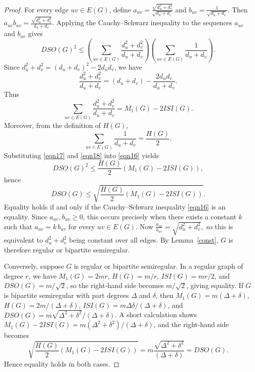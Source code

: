 \documentclass{article}
\theoremstyle{definition}
\begin{document}
\begin{proof}
For every edge $uv\in E(G)$, define
$
a_{uv}=\frac{\sqrt{d_u^2+d_v^2}}{\sqrt{d_u+d_v}}$ and $b_{uv}=\frac{1}{\sqrt{d_u+d_v}}$.
Then $a_{uv} b_{uv}=\frac{\sqrt{d_u^2+d_v^2}}{d_u+d_v}$.
Applying the Cauchy–Schwarz inequality to the sequences $a_{uv}$ and $b_{uv}$ gives
\begin{equation}\label{eqn16}
DSO(G)^2
\le 
\left(\sum_{uv\in E(G)} \frac{d_u^2+d_v^2}{d_u+d_v}\right)
\left(\sum_{uv\in E(G)} \frac{1}{d_u+d_v}\right). 
\end{equation}
Since $d_u^2+d_v^2=(d_u+d_v)^2-2d_u d_v$, we have
\[
\frac{d_u^2+d_v^2}{d_u+d_v}
=
(d_u+d_v)-\frac{2d_u d_v}{d_u+d_v}.
\]
Thus
\begin{equation}\label{eqn17}
\sum_{uv\in E(G)} \frac{d_u^2+d_v^2}{d_u+d_v}
=
M_1(G)-2ISI(G).
\end{equation}
Moreover, from the definition of $H(G)$,
\begin{equation}\label{eqn18}
\sum_{uv\in E(G)} \frac{1}{d_u+d_v}
=
\frac{H(G)}{2}. 
\end{equation}
Substituting \eqref{eqn17} and \eqref{eqn18} into \eqref{eqn16} yields
\[
DSO(G)^2
\le 
\frac{H(G)}{2} \left(M_1(G)-2ISI(G)\right),
\]
hence
\[
DSO(G)
\le 
\sqrt{\frac{H(G)}{2} \left(M_1(G)-2ISI(G)\right)}.
\]
Equality holds if and only if the Cauchy–Schwarz inequality \eqref{eqn16} is an equality. Since $a_{uv}, b_{uv}\ge 0$, this occurs precisely when there exists a constant $k$ such that $a_{uv}=k\,b_{uv}$ for every $uv\in E(G)$.
Now
$
\frac{a_{uv}}{b_{uv}} = \sqrt{d_u^2+d_v^2},
$
so this is equivalent to
$d_u^2+d_v^2$
being constant over all edges.
 By Lemma~\ref{const}, $G$ is therefore regular or bipartite semiregular.

Conversely, suppose $G$ is regular or bipartite semiregular.
In a regular graph of degree $r$, we have
$M_1(G)=2mr$, $H(G)=m/r$, $ISI(G)=mr/2$, and $DSO(G)=m/\sqrt{2}$,
so the right‑hand side becomes
$ m/\sqrt{2}$, giving equality.
If $G$ is bipartite semiregular with part degrees $\Delta$ and $\delta$, then
$M_1(G)=m(\Delta+\delta)$, $H(G)=2m/(\Delta+\delta)$,
$ISI(G)=m\Delta\delta/(\Delta+\delta)$, and
$DSO(G)=m\sqrt{\Delta^2+\delta^2}/(\Delta+\delta)$.
A short calculation shows
$M_1(G)-2ISI(G)=m(\Delta^2+\delta^2)/(\Delta+\delta)$,
and the right‑hand side becomes
\[\sqrt{\frac{H(G)}{2}(M_1(G)-2ISI(G))}
= m\frac{\sqrt{\Delta^2+\delta^2}}{(\Delta+\delta)}=DSO(G).\]
Hence equality holds in both cases.
\end{proof}
\end{document}
